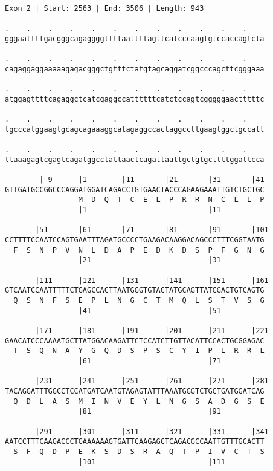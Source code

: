 \documentclass{article}
\begin{document}
\newpage
\begin{Verbatim}
Exon 2 | Start: 2563 | End: 3506 | Length: 943
 
.    .    .    .    .    .    .    .    .    .    .    .    
gggaattttgacgggcagaggggttttaattttagttcatcccaagtgtccaccagtcta
  
.    .    .    .    .    .    .    .    .    .    .    .    
cagaggaggaaaaagagacgggctgtttctatgtagcaggatcggcccagcttcgggaaa
  
.    .    .    .    .    .    .    .    .    .    .    .    
atggagttttcagaggctcatcgaggccattttttcatctccagtcgggggaactttttc
  
.    .    .    .    .    .    .    .    .    .    .    .    
tgcccatggaagtgcagcagaaaggcatagaggccactaggccttgaagtggctgccatt
  
.    .    .    .    .    .    .    .    .    .    .    .    
ttaaagagtcgagtcagatggcctattaactcagattaattgctgtgcttttggattcca
  
        |-9      |1        |11       |21       |31       |41
GTTGATGCCGGCCCAGGATGGATCAGACCTGTGAACTACCCAGAAGAAATTGTCTGCTGC
                 M  D  Q  T  C  E  L  P  R  R  N  C  L  L  P
                 |1                            |11          
  
       |51       |61       |71       |81       |91       |101
CCTTTTCCAATCCAGTGAATTTAGATGCCCCTGAAGACAAGGACAGCCCTTTCGGTAATG
  F  S  N  P  V  N  L  D  A  P  E  D  K  D  S  P  F  G  N  G
                 |21                           |31          
  
       |111      |121      |131      |141      |151      |161
GTCAATCCAATTTTTCTGAGCCACTTAATGGGTGTACTATGCAGTTATCGACTGTCAGTG
  Q  S  N  F  S  E  P  L  N  G  C  T  M  Q  L  S  T  V  S  G
                 |41                           |51          
  
       |171      |181      |191      |201      |211      |221
GAACATCCCAAAATGCTTATGGACAAGATTCTCCATCTTGTTACATTCCACTGCGGAGAC
  T  S  Q  N  A  Y  G  Q  D  S  P  S  C  Y  I  P  L  R  R  L
                 |61                           |71          
  
       |231      |241      |251      |261      |271      |281
TACAGGATTTGGCCTCCATGATCAATGTAGAGTATTTAAATGGGTCTGCTGATGGATCAG
  Q  D  L  A  S  M  I  N  V  E  Y  L  N  G  S  A  D  G  S  E
                 |81                           |91          
  
       |291      |301      |311      |321      |331      |341
AATCCTTTCAAGACCCTGAAAAAAGTGATTCAAGAGCTCAGACGCCAATTGTTTGCACTT
  S  F  Q  D  P  E  K  S  D  S  R  A  Q  T  P  I  V  C  T  S
                 |101                          |111         
  

\end{Verbatim}
\end{document}
